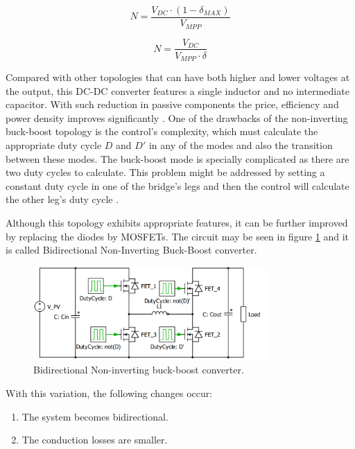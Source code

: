 \begin{equation} \label{boost_number_of_panels}
 N = \frac{V_{DC} \cdot (1 - \delta_{MAX})}{V_{MPP}}
\end{equation}

\begin{equation} \label{buck_number_of_panels}
 N = \frac{V_{DC}}{V_{MPP} \cdot \delta}
\end{equation}
		
Compared with other topologies that can have both higher and lower voltages at the output, this DC-DC converter features a single inductor and no intermediate capacitor. With such reduction in passive components the price, efficiency and power density improves significantly \cite{underthehood}. One of the drawbacks of the non-inverting buck-boost topology is the control's complexity, which must calculate the appropriate duty cycle $D$ and $D'$ in any of the modes and also the transition between these modes. The buck-boost mode is specially complicated as there are two duty cycles to calculate. This problem might be addressed by setting a constant duty cycle in one of the bridge's legs and then the control will calculate the other leg's duty cycle  \cite{AN4449_ST}.
		
Although this topology exhibits appropriate features, it can be further improved by replacing the diodes by MOSFETs. The circuit may be seen in figure \ref{BID_N_INV_BB_SCHEMATIC} and it is called Bidirectional Non-Inverting Buck-Boost converter.

\begin{figure}[H]
	\begin{center}
		\includegraphics[width=0.8\textwidth]{../Pictures/BID_H_B_BB}
		\caption{Bidirectional Non-inverting buck-boost converter.}
		\label{BID_N_INV_BB_SCHEMATIC}
	\end{center}
\end{figure}

With this variation, the following changes occur:
		
\begin{enumerate}
	\item The system becomes bidirectional.
	\item The conduction losses are smaller. 
\end{enumerate}

